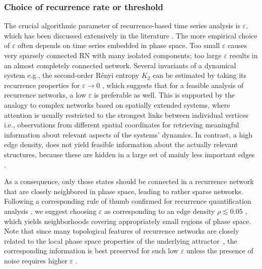 		\subsubsection{Choice of recurrence rate or threshold} \label{subsub:epsilon}
        		The crucial algorithmic parameter of recurrence-based time series analysis is  $\varepsilon$, which has been discussed extensively  in the literature \cite{marwan2007,Donner2010b}. The more empirical choice of $\varepsilon$ often depends on time series embedded in phase space. Too small $\varepsilon$ causes very sparsely connected RN with many isolated components; too large $\varepsilon$ results in an almost completely connected network. Several invariants of a dynamical system  e.g., the second-order R\'enyi entropy $K_2$  can be estimated by taking its recurrence properties for $\varepsilon \to 0$ \cite{Grassberger1983PLA,Grassberger1983PRL}, which suggests that for a feasible analysis of recurrence networks, a low $\varepsilon$ is preferable as well. This is supported by the analogy to complex networks based on spatially extended systems, where attention is usually restricted to the strongest links between individual vertices  i.e., observations from different spatial coordinates for retrieving meaningful information about relevant aspects of the systems' dynamics. In contrast, a high edge density, does not yield feasible information about the actually relevant structures, because these are hidden in a large set of mainly less important edges \cite{Donner2010b}.

		As a consequence, only those states should be connected in a recurrence network that are closely neighbored in phase space, leading to rather sparse networks. Following a corresponding rule of thumb confirmed for recurrence quantification analysis \cite{schinkel2008}, we suggest choosing $\varepsilon$ as corresponding to an edge density $\rho \lesssim 0.05$ \cite{Marwan2009,Donner2010a}, which yields neighborhoods covering appropriately small regions of phase space. Note that since many topological features of recurrence networks are closely related to the local phase space properties of the underlying attractor~\cite{Donner2010a}, the corresponding information is best preserved for such low $\varepsilon$ unless the presence of noise requires higher $\varepsilon$ \cite{schinkel2008}. 

